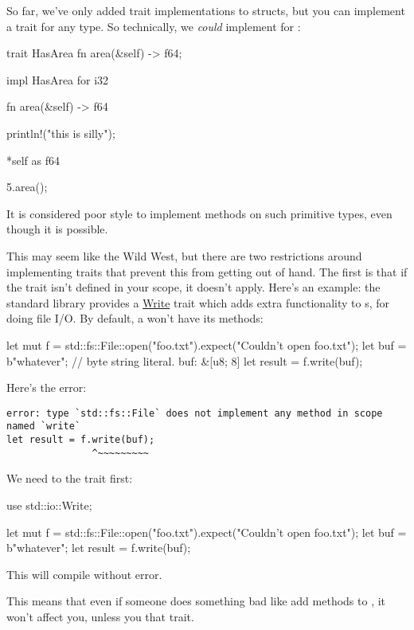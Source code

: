 So far, we've only added trait implementations to structs, but you can implement a trait for any type. So technically, we \emph{could} 
implement  for \itt:

\begin{rustc}
trait HasArea {
    fn area(&self) -> f64;
}

impl HasArea for i32 {
    fn area(&self) -> f64 {
        println!("this is silly");

        *self as f64
    }
}

5.area();
\end{rustc}

It is considered poor style to implement methods on such primitive types, even though it is possible.

\blank

This may seem like the Wild West, but there are two restrictions around implementing traits that prevent this from getting out of hand. 
The first is that if the trait isn't defined in your scope, it doesn't apply. Here's an example: the standard library provides a 
\href{https://doc.rust-lang.org/std/io/trait.Write.html}{Write} trait which adds extra functionality to s, for doing file I/O. 
By default, a  won't have its methods:

\begin{rustc}
let mut f = std::fs::File::open("foo.txt").expect("Couldn't open foo.txt");
let buf = b"whatever"; // byte string literal. buf: &[u8; 8]
let result = f.write(buf);
\end{rustc}

Here's the error:

\begin{verbatim}
error: type `std::fs::File` does not implement any method in scope named `write`
let result = f.write(buf);
               ^~~~~~~~~~
\end{verbatim}

We need to  the  trait first:

\begin{rustc}
use std::io::Write;

let mut f = std::fs::File::open("foo.txt").expect("Couldn't open foo.txt");
let buf = b"whatever";
let result = f.write(buf);
\end{rustc}

This will compile without error.

\blank

This means that even if someone does something bad like add methods to \itt, it won't affect you, unless you  that trait.

